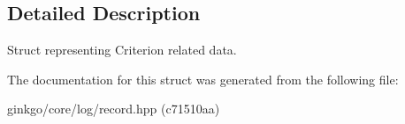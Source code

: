\subsection{Detailed Description}
Struct representing Criterion related data. 

The documentation for this struct was generated from the following file\+:\begin{DoxyCompactItemize}
\item 
ginkgo/core/log/record.\+hpp (c71510aa)\end{DoxyCompactItemize}
